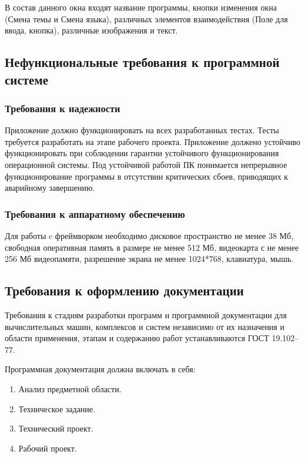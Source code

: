 В состав данного окна входят название программы, кнопки изменения окна (Смена темы и Смена языка), различных элементов взаимодействия (Поле для ввода, кнопка), различные изображения и текст.

\subsection{Нефункциональные требования к программной системе}

\subsubsection{Требования к надежности}
Приложение должно функционировать на всех разработанных тестах. Тесты требуется разработать на этапе рабочего проекта.
Приложение должено устойчиво функционировать при соблюдении гарантии устойчивого функционирования операционной системы. Под устойчивой работой ПК понимается непрерывное функционирование программы в отсутствии критических сбоев, приводящих к аварийному завершению.

\subsubsection{Требования к аппаратному обеспечению}

Для работы c фреймворком необходимо дисковое пространство не менее 38 Мб, свободная оперативная память в размере не менее 512 Мб, видеокарта с не менее 256 Мб видеопамяти, разрешение экрана не менее 1024*768, клавиатура, мышь.

\subsection{Требования к оформлению документации}

Требования к стадиям разработки программ и программной документации для вычислительных машин, комплексов и систем независимо от их назначения и области применения, этапам и содержанию работ устанавливаются ГОСТ 19.102–77.

Программная документация должна включать в себя:
\begin{enumerate}
	\item Анализ предметной области.
	\item Техническое задание.
	\item Технический проект.
	\item Рабочий проект.
\end{enumerate}

